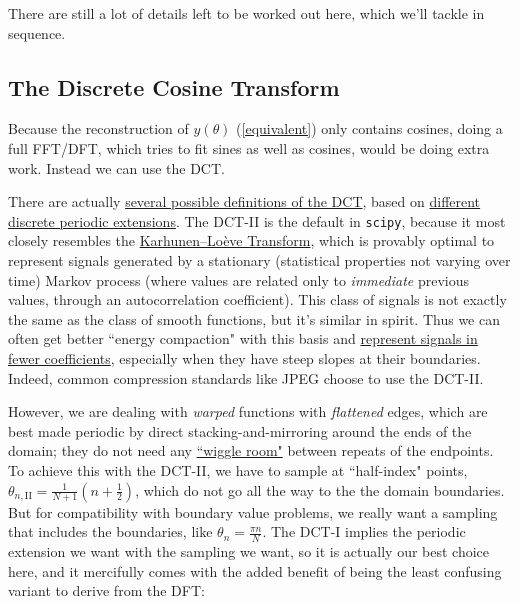 \documentclass[10pt]{article}
\begin{document}
There are still a lot of details left to be worked out here, which we'll tackle in sequence.

\subsection{The Discrete Cosine Transform}\label{fftdct}

Because the reconstruction of $y(\theta)$ (\autoref{equivalent}) only contains cosines, doing a full FFT/DFT, which tries to fit sines as well as cosines, would be doing extra work. Instead we can use the DCT.

There are actually \href{https://docs.scipy.org/doc/scipy/reference/generated/scipy.fft.dct.html}{several possible definitions of the DCT}\cite{dct}, based on \href{https://en.wikipedia.org/wiki/Discrete_cosine_transform#Informal_overview}{different discrete periodic extensions}. The DCT-II is the default in \texttt{scipy}\cite{dct}, because it most closely resembles the \href{https://www.farbrausch.de/%7Efg/articles/dct_klt.pdf}{Karhunen–Loève Transform}\cite{klt}, which is provably optimal to represent signals generated by a stationary (statistical properties not varying over time) Markov process (where values are related only to \textit{immediate} previous values, through an autocorrelation coefficient). This class of signals is not exactly the same as the class of smooth functions, but it's similar in spirit. Thus we can often get better ``energy compaction" with this basis and \href{https://dsp.stackexchange.com/a/96197/40873}{represent signals in fewer coefficients}\cite{energycompaction}, especially when they have steep slopes at their boundaries. Indeed, common compression standards like JPEG choose to use the DCT-II.

However, we are dealing with \textit{warped} functions with \textit{flattened} edges, which are best made periodic by direct stacking-and-mirroring around the ends of the domain; they do not need any \href{https://github.com/pavelkomarov/spectral-derivatives/blob/main/notebooks/dct_types_comparison_and_derivatives.ipynb}{``wiggle room"} between repeats of the endpoints. To achieve this with the DCT-II, we have to sample at ``half-index" points, $\theta_{n,\text{II}} = \frac{1}{N+1}(n + \frac{1}{2})$, which do not go all the way to the the domain boundaries. But for compatibility with boundary value problems, we really want a sampling that includes the boundaries, like $\theta_n = \frac{\pi n}{N}$. The DCT-I implies the periodic extension we want with the sampling we want, so it is actually our best choice here, and it mercifully comes with the added benefit of being the least confusing variant to derive from the DFT:
\end{document}
